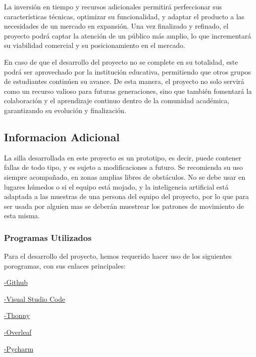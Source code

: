\documentclass{article}
\begin{document}
La inversión en tiempo y recursos adicionales permitirá perfeccionar sus características técnicas, optimizar su funcionalidad, y adaptar el producto a las necesidades de un mercado en expansión. Una vez finalizado y refinado, el proyecto podrá captar la atención de un público más amplio, lo que incrementará su viabilidad comercial y su posicionamiento en el mercado.

En caso de que el desarrollo del proyecto no se complete en su totalidad, este podrá ser aprovechado por la institución educativa, permitiendo que otros grupos de estudiantes continúen su avance. De esta manera, el proyecto no solo servirá como un recurso valioso para futuras generaciones, sino que también fomentará la colaboración y el aprendizaje continuo dentro de la comunidad académica, garantizando su evolución y finalización.
\subsection {Informacion Adicional}
La silla desarrollada en este proyecto es un prototipo, es decir, puede contener fallas de todo tipo, y es sujeto a modificaciones a futuro. Se recomienda su uso siempre acompañado, en zonas amplias libres de obstáculos. No se debe usar en lugares húmedos o si el equipo está mojado, y la inteligencia artificial está adaptada a las muestras de una persona del equipo del proyecto, por lo que para ser usada por alguien mas se deberán muestrear los patrones de movimiento de esta misma.

\subsubsection{Programas Utilizados}
Para el desarrollo del proyecto, hemos requerido hacer uso de los siguientes porogramas, con sus enlaces principales: \newline


    \href{https://github.com/}{-Github}    
    \newline

    \href{https://code.visualstudio.com/}{-Visual Studio Code}
    \newline

    \href{https://thonny.org/}{-Thonny}
    \newline

    \href{https://es.overleaf.com/project}{-Overleaf}
    \newline

    \href{https://www.jetbrains.com/es-es/pycharm/}{-Pycharm}
    \newline
\end{document}
